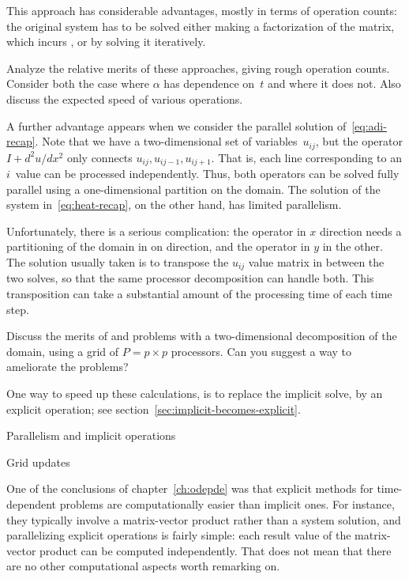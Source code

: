 This approach has considerable advantages, mostly in terms of
operation counts: the original system has to be solved either making a
factorization of the matrix, which incurs , or by
solving it iteratively.

\begin{exercise}
  Analyze the relative merits of these approaches, giving rough
  operation counts. Consider both the case where $\alpha$ has
  dependence on~$t$ and where it does not. Also discuss the expected
  speed of various operations.
\end{exercise}

A further advantage appears when we consider the parallel solution
of~\eqref{eq:adi-recap}. Note that we have a two-dimensional set of
variables~$u_{ij}$, but the operator $I+d^2u/dx^2$ only connects
$u_{ij},u_{ij-1},u_{ij+1}$. That is, each line corresponding to an
$i$~value can be processed independently. Thus, both operators can be
solved fully parallel using a one-dimensional partition on the domain.
The solution of the system in~\eqref{eq:heat-recap}, on the other
hand, has limited parallelism.

Unfortunately, there is a serious complication: the operator in $x$
direction needs a partitioning of the domain in on direction, and the
operator in $y$ in the other. The solution usually taken is to
transpose the $u_{ij}$ value matrix in between the two solves, so that
the same processor decomposition can handle both. This transposition
can take a substantial amount of the processing time of each time step.

\begin{exercise}
  Discuss the merits of and problems with a two-dimensional
  decomposition of the domain, using a grid of $P=p\times p$
  processors. Can you suggest a way to ameliorate the problems?
\end{exercise}

One way to speed up these calculations, is to replace the implicit
solve, by an explicit operation; see
section~\ref{sec:implicit-becomes-explicit}.

 {Parallelism and implicit operations}
\label{sec:parallel-implicit}


 {Grid updates}

One of the conclusions of chapter~\ref{ch:odepde} was that explicit
methods for time-dependent problems are computationally easier than
implicit ones.  For instance, they typically involve a matrix-vector
product rather than a system solution, and parallelizing explicit
operations is fairly simple: each result value of the matrix-vector
product can be computed independently. That does not mean that there
are no other computational aspects worth remarking on.

